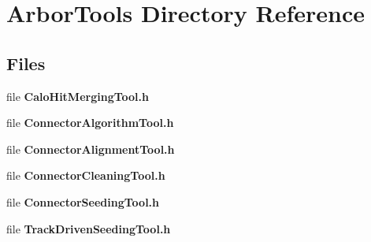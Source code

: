 \section{Arbor\+Tools Directory Reference}
\label{dir_9d113ba601420d5fb7fce7486b87a797}
\subsection*{Files}
\begin{DoxyCompactItemize}
\item 
file {\bf Calo\+Hit\+Merging\+Tool.\+h}
\item 
file {\bf Connector\+Algorithm\+Tool.\+h}
\item 
file {\bf Connector\+Alignment\+Tool.\+h}
\item 
file {\bf Connector\+Cleaning\+Tool.\+h}
\item 
file {\bf Connector\+Seeding\+Tool.\+h}
\item 
file {\bf Track\+Driven\+Seeding\+Tool.\+h}
\end{DoxyCompactItemize}
